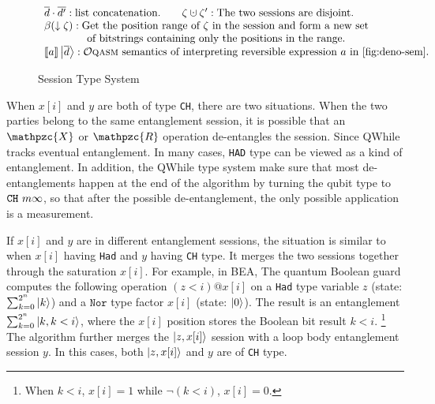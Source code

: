 \begin{figure}[t]
{{\begin{mathpar}
  \end{mathpar}
}
{\footnotesize
\[
\begin{array}{l}
\overline{d}\cdot\overline{d'} : \text{list concatenation.}
\qquad
\zeta\cupdot \zeta': \text{The two sessions are disjoint.}
\\
\beta(\downarrow\zeta) : \text{Get the position range of }\zeta
\text{ in the session and form a new set}
\\
\qquad\qquad\text{of bitstrings containing only the positions in the range.}
\\
\llbracket a \rrbracket\ket{\overline{d}}:
\text{\oqasm semantics of interpreting reversible expression }a\text{ in \Cref{fig:deno-sem}.}
\end{array}
\]
}
}
  \caption{Session Type System}
  \label{fig:exp-sessiontype}
\end{figure}

When $x[i]$ and $y$ are both of type \texttt{CH}, there are two situations.
When the two parties belong to the same entanglement session,
it is possible that an $\mathpzc{X}$ or $\mathpzc{R}$ operation de-entangles the session.
Since QWhile tracks eventual entanglement.
In many cases, \texttt{HAD} type can be viewed as a kind of entanglement.
In addition, the QWhile type system make sure that most de-entanglements happen
at the end of the algorithm by turning the qubit type to $\tch{m}{\infty}$,
so that after the possible de-entanglement, the only possible application is a measurement.

If $x[i]$ and $y$ are in different entanglement sessions,
the situation is similar to when $x[i]$ having \texttt{Had} and $y$ having \texttt{CH} type.
It merges the two sessions together through the saturation $x[i]$.
For example, in BEA, The quantum Boolean guard computes the following operation $(z < i) @ x[i]$
on a \texttt{Had} type variable $z$ (state: $\sum_{k=0}^{2^n}\ket{k}$)
and a $\texttt{Nor}$ type factor $x[i]$ (state: $\ket{0}$).
The result is an entanglement $\sum_{k=0}^{2^n}\ket{k,k < i}$,
where the $x[i]$ position stores the Boolean bit result $k < i$. \footnote{When $k<i$, $x[i]=1$ while $\neg (k<i)$, $x[i]=0$.}
The algorithm further merges the $\ket{z,x[i]}$ session with a loop body entanglement session $y$. 
In this cases, both $\ket{z,x[i]}$ and $y$ are of \texttt{CH} type. 


